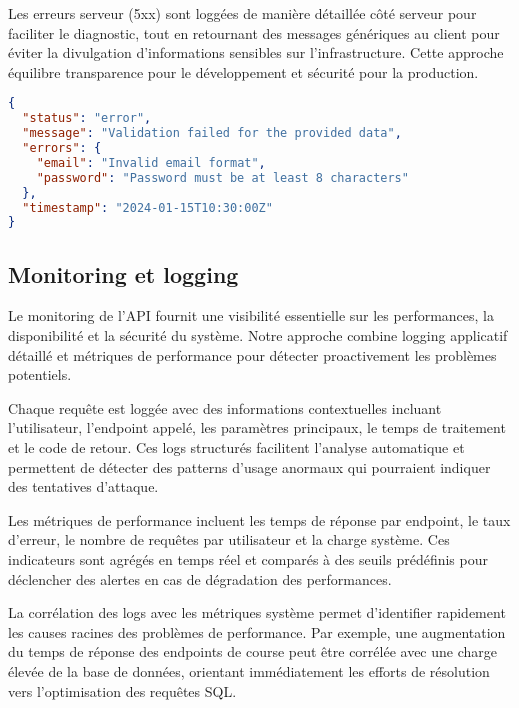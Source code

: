 Les erreurs serveur (5xx) sont loggées de manière détaillée côté serveur pour faciliter le diagnostic, tout en retournant des messages génériques au client pour éviter la divulgation d'informations sensibles sur l'infrastructure. Cette approche équilibre transparence pour le développement et sécurité pour la production.

\begin{lstlisting}[language=json, caption=Format standardisé des réponses d'erreur]
{
  "status": "error",
  "message": "Validation failed for the provided data",
  "errors": {
    "email": "Invalid email format",
    "password": "Password must be at least 8 characters"
  },
  "timestamp": "2024-01-15T10:30:00Z"
}
\end{lstlisting}

\subsection{Monitoring et logging}

Le monitoring de l'API fournit une visibilité essentielle sur les performances, la disponibilité et la sécurité du système. Notre approche combine logging applicatif détaillé et métriques de performance pour détecter proactivement les problèmes potentiels.

Chaque requête est loggée avec des informations contextuelles incluant l'utilisateur, l'endpoint appelé, les paramètres principaux, le temps de traitement et le code de retour. Ces logs structurés facilitent l'analyse automatique et permettent de détecter des patterns d'usage anormaux qui pourraient indiquer des tentatives d'attaque.

Les métriques de performance incluent les temps de réponse par endpoint, le taux d'erreur, le nombre de requêtes par utilisateur et la charge système. Ces indicateurs sont agrégés en temps réel et comparés à des seuils prédéfinis pour déclencher des alertes en cas de dégradation des performances.

La corrélation des logs avec les métriques système permet d'identifier rapidement les causes racines des problèmes de performance. Par exemple, une augmentation du temps de réponse des endpoints de course peut être corrélée avec une charge élevée de la base de données, orientant immédiatement les efforts de résolution vers l'optimisation des requêtes SQL.